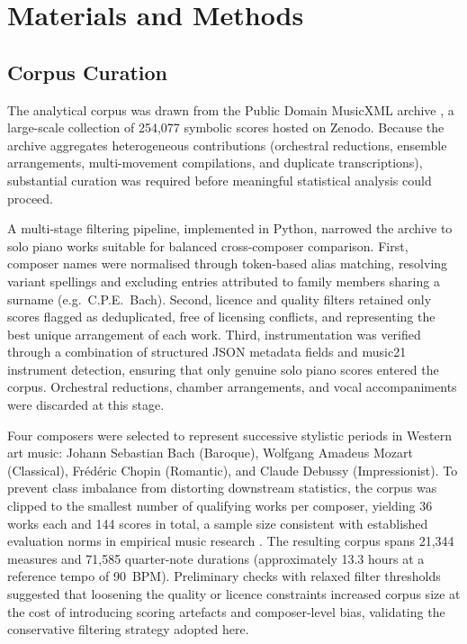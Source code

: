 \documentclass[]{interact}
\theoremstyle{plain}
\theoremstyle{definition}
\theoremstyle{remark}
\begin{document}
\section{Materials and Methods}\label{sec:methods}

\subsection{Corpus Curation}

The analytical corpus was drawn from the Public Domain MusicXML archive
\citep[PDMX;][]{PDMX2024}, a large-scale collection of 254,077 symbolic scores
hosted on Zenodo. Because the archive aggregates heterogeneous contributions
(orchestral reductions, ensemble arrangements, multi-movement compilations, and
duplicate transcriptions), substantial curation was required before meaningful
statistical analysis could proceed.

A multi-stage filtering pipeline, implemented in Python, narrowed the archive to
solo piano works suitable for balanced cross-composer comparison. First,
composer names were normalised through token-based alias matching, resolving
variant spellings and excluding entries attributed to family members sharing a
surname (e.g.\ C.P.E.\ Bach). Second, licence and quality filters retained only
scores flagged as deduplicated, free of licensing conflicts, and representing the
best unique arrangement of each work. Third, instrumentation was verified through
a combination of structured JSON metadata fields and music21 instrument detection,
ensuring that only genuine solo piano scores entered the corpus. Orchestral
reductions, chamber arrangements, and vocal accompaniments were discarded at
this stage.

Four composers were selected to represent successive stylistic periods in Western
art music: Johann Sebastian Bach (Baroque), Wolfgang Amadeus Mozart (Classical),
Fr\'ed\'eric Chopin (Romantic), and Claude Debussy (Impressionist). To prevent
class imbalance from distorting downstream statistics, the corpus was clipped to
the smallest number of qualifying works per composer, yielding 36 works each and
144 scores in total, a sample size consistent with established evaluation norms in empirical music research \citep{Urbano2013}. The resulting corpus spans 21,344 measures and 71,585
quarter-note durations (approximately 13.3 hours at a reference tempo of
90~BPM). Preliminary checks with relaxed filter thresholds suggested
that loosening the quality or licence constraints increased corpus size at the
cost of introducing scoring artefacts and composer-level bias, validating the
conservative filtering strategy adopted here.
\end{document}
